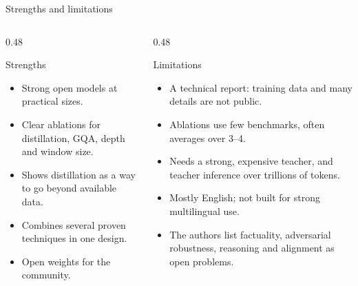 \documentclass[aspectratio=169,11pt]{beamer}
\begin{document}
\begin{frame}{Strengths and limitations}
  \begin{columns}[T]
    \begin{column}{0.48\textwidth}
      \begin{exampleblock}{Strengths}
        \small
        \begin{itemize}
          \item Strong open models at practical sizes.
          \item Clear ablations for distillation, GQA, depth and window size.
          \item Shows distillation as a way to go beyond available data.
          \item Combines several proven techniques in one design.
          \item Open weights for the community.
        \end{itemize}
      \end{exampleblock}
    \end{column}
    \begin{column}{0.48\textwidth}
      \begin{alertblock}{Limitations}
        \small
        \begin{itemize}
          \item A technical report: training data and many details are not public.
          \item Ablations use few benchmarks, often averages over 3--4.
          \item Needs a strong, expensive teacher, and teacher inference over trillions of tokens.
          \item Mostly English; not built for strong multilingual use.
          \item The authors list factuality, adversarial robustness, reasoning and alignment as open problems.
        \end{itemize}
      \end{alertblock}
    \end{column}
  \end{columns}
\end{frame}
\end{document}
